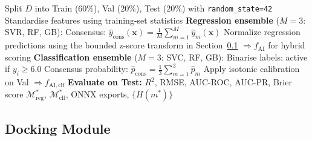 \documentclass[conference]{IEEEtran}
\newcommand{\rev}[2]{#2}
\begin{document}
\begin{algorithm}[!htbp]
\scriptsize
\caption{Consensus AI Ensemble Training}
\label{alg:ensemble}
Split $D$ into Train (60\%), Val (20\%), Test (20\%)
  with \texttt{random\_state=42}\;
Standardise features using training-set statistics\;
\BlankLine
\textbf{Regression ensemble} (\rev{R2.1}{$M = 3$: SVR, RF, GB}):\;
Consensus: $\hat{y}_{\mathrm{cons}}(\mathbf{x})
  = \frac{1}{M}\sum_{m=1}^{M} \hat{y}_m(\mathbf{x})$\;
\rev{R2.3}{Normalize regression predictions using the bounded
  z-score transform in Section~\ref{sec:docking}
  $\Rightarrow f_{\mathrm{AI}}$ for hybrid scoring}\;
\BlankLine
\textbf{Classification ensemble} ($M = 3$: SVC, RF, GB):\;
Binarise labels: active if $y_i \geq 6.0$\;
Consensus probability: $\hat{p}_{\mathrm{cons}}
  = \frac{1}{3}\sum_{m=1}^{3} \hat{p}_m$\;
Apply isotonic calibration on Val
  $\Rightarrow f_{\mathrm{AI,clf}}$\;
\BlankLine
\textbf{Evaluate on Test:}
  $R^2$, RMSE, AUC-ROC, AUC-PR, Brier score\;
\Return $\mathcal{M}_{\mathrm{reg}}^*$,
  $\mathcal{M}_{\mathrm{clf}}^*$,
  ONNX exports, $\{H(m^*)\}$\;
\end{algorithm}

\subsection{\textbf{Docking Module}}
\label{sec:docking}
\end{document}
